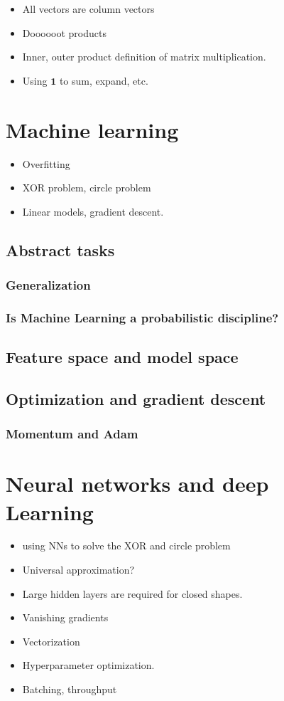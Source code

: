 \documentclass{pca}
\newcommand{\one}{\mathbold 1}
\theoremstyle{theorem}
\theoremstyle{definition}
\theoremstyle{proof}
\begin{document}
\begin{itemize}
\item All vectors are column vectors
\item Doooooot products
\item Inner, outer product definition of matrix multiplication.	
\item Using $\one$ to sum, expand, etc.
\end{itemize}

\chapter{Machine learning}

\begin{itemize}
	\item Overfitting
	\item XOR problem, circle problem
	\item Linear models, gradient descent.
\end{itemize}

\section{Abstract tasks}

\subsection{Generalization}
\subsection{Is Machine Learning a probabilistic discipline?}
\section{Feature space and model space}
\section{Optimization and gradient descent}
\subsection{Momentum and Adam}

\chapter{Neural networks and deep Learning}

\begin{itemize}
    \item using NNs to solve the XOR and circle problem
    \item Universal approximation?
    \item Large hidden layers are required for closed shapes.
    \item Vanishing gradients
	\item Vectorization
	\item Hyperparameter optimization.
	\item Batching, throughput
\end{itemize}
\end{document}
